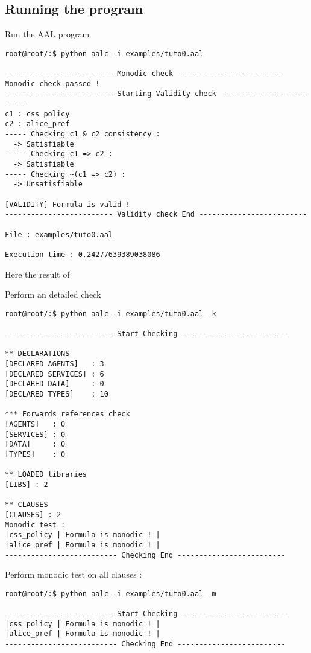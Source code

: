 \subsection{Running the program}

\begin{itemize}
	\item Run the AAL program
{\lstset{style=shell}
\begin{lstlisting}
root@root/:$ python aalc -i examples/tuto0.aal

------------------------- Monodic check -------------------------
Monodic check passed !
------------------------- Starting Validity check -------------------------
c1 : css_policy
c2 : alice_pref
----- Checking c1 & c2 consistency :
  -> Satisfiable
----- Checking c1 => c2 :
  -> Satisfiable
----- Checking ~(c1 => c2) :
  -> Unsatisfiable

[VALIDITY] Formula is valid !
------------------------- Validity check End -------------------------

File : examples/tuto0.aal

Execution time : 0.24277639389038086
\end{lstlisting}

Here the result of

	\item Perform an detailed check
\begin{lstlisting}
root@root/:$ python aalc -i examples/tuto0.aal -k

------------------------- Start Checking -------------------------

** DECLARATIONS
[DECLARED AGENTS]   : 3
[DECLARED SERVICES] : 6
[DECLARED DATA]     : 0
[DECLARED TYPES]    : 10

*** Forwards references check
[AGENTS]   : 0
[SERVICES] : 0
[DATA]     : 0
[TYPES]    : 0

** LOADED libraries
[LIBS] : 2

** CLAUSES
[CLAUSES] : 2
Monodic test :
|css_policy | Formula is monodic ! |
|alice_pref | Formula is monodic ! |
-------------------------- Checking End -------------------------
\end{lstlisting}


	\item Perform monodic test on all clauses :
\begin{lstlisting}
root@root/:$ python aalc -i examples/tuto0.aal -m

------------------------- Start Checking -------------------------
|css_policy | Formula is monodic ! |
|alice_pref | Formula is monodic ! |
-------------------------- Checking End -------------------------
\end{lstlisting}


}
\end{itemize}
